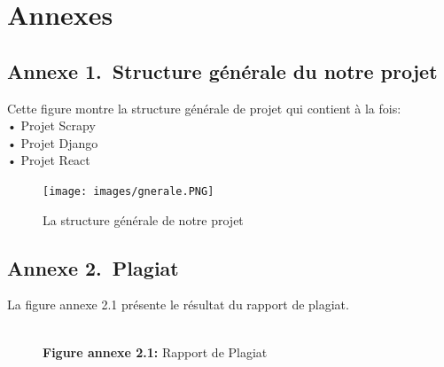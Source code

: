 \chapter*{Annexes}

\section*{Annexe 1.~Structure générale du notre projet}
Cette figure montre la structure générale de projet qui contient à la fois:\\
• Projet Scrapy\\
• Projet Django\\
• Projet React\\
\begin{figure}[H]
	\centering
	\texttt{[image: images/gnerale.PNG]}
	\caption{La structure générale de notre projet}
	\label{fig:flowchartdiagram-update-boutique}
\end{figure}
\newpage
\section*{Annexe 2.~Plagiat}

La figure annexe 2.1 présente le résultat du rapport de plagiat.
\begin{figure}[H]
    \centering
    {\\\textbf{Figure annexe 2.1:} Rapport de Plagiat}
\end{figure}
